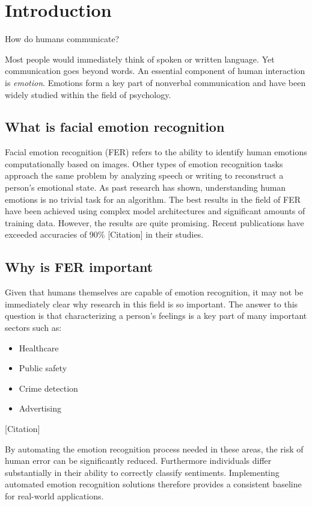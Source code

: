 \section{Introduction}
\label{sec:introduction}

How do humans communicate?

Most people would immediately think of spoken or written language. Yet communication goes beyond words.
An essential component of human interaction is \textit{emotion}. Emotions form a key part of nonverbal communication and have been
widely studied within the field of psychology.

\subsection{What is facial emotion recognition}

Facial emotion recognition (FER) refers to the ability to identify human emotions computationally based on images. Other types of emotion recognition tasks 
approach the same problem by analyzing speech or writing to reconstruct a person's emotional state. As past research has shown, understanding human emotions 
is no trivial task for an algorithm. The best results in the field of FER have been achieved using complex model architectures and significant amounts of training
data. However, the results are quite promising. Recent publications have exceeded accuracies of 90\% [Citation] in their studies.

\subsection{Why is FER important}

Given that humans themselves are capable of emotion recognition, it may not be immediately clear why research in this field is so important. The answer
to this question is that characterizing a person's feelings is a key part of many important sectors such as:

\begin{itemize}
    \item Healthcare
    \item Public safety
    \item Crime detection
    \item Advertising
\end{itemize}
[Citation]

By automating the emotion recognition process needed in these areas, the risk of human error can be significantly reduced. Furthermore individuals 
differ substantially in their ability to correctly classify sentiments. Implementing automated emotion recognition solutions therefore provides a
consistent baseline for real-world applications.

